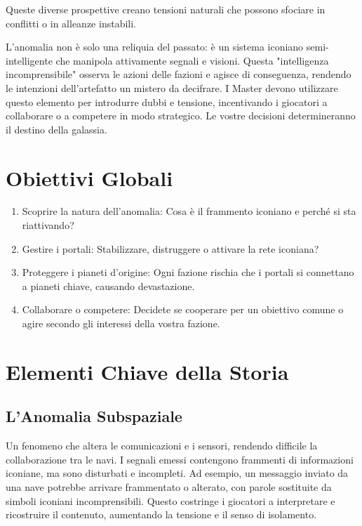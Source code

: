 \documentclass[letterpaper,twocolumn,openany,nodeprecatedcode]{dndbook}
\begin{document}
Queste diverse prospettive creano tensioni naturali che possono sfociare in conflitti o in alleanze instabili.

L’anomalia non è solo una reliquia del passato: è un sistema iconiano semi-intelligente che manipola attivamente segnali e visioni. Questa "intelligenza incomprensibile" osserva le azioni delle fazioni e agisce di conseguenza, rendendo le intenzioni dell’artefatto un mistero da decifrare. I Master devono utilizzare questo elemento per introdurre dubbi e tensione, incentivando i giocatori a collaborare o a competere in modo strategico. Le vostre decisioni determineranno il destino della galassia.



\section{ Obiettivi Globali
}

\begin{enumerate}
    \item Scoprire la natura dell’anomalia: Cosa è il frammento iconiano e perché si sta riattivando?
    \item Gestire i portali: Stabilizzare, distruggere o attivare la rete iconiana?
    \item Proteggere i pianeti d’origine: Ogni fazione rischia che i portali si connettano a pianeti chiave, causando devastazione.
    \item Collaborare o competere: Decidete se cooperare per un obiettivo comune o agire secondo gli interessi della vostra fazione.
\end{enumerate}



\section{ Elementi Chiave della Storia
}

\subsection{ L’Anomalia Subspaziale
}

Un fenomeno che altera le comunicazioni e i sensori, rendendo difficile la collaborazione tra le navi. I segnali emessi contengono frammenti di informazioni iconiane, ma sono disturbati e incompleti. Ad esempio, un messaggio inviato da una nave potrebbe arrivare frammentato o alterato, con parole sostituite da simboli iconiani incomprensibili. Questo costringe i giocatori a interpretare e ricostruire il contenuto, aumentando la tensione e il senso di isolamento.
\end{document}
